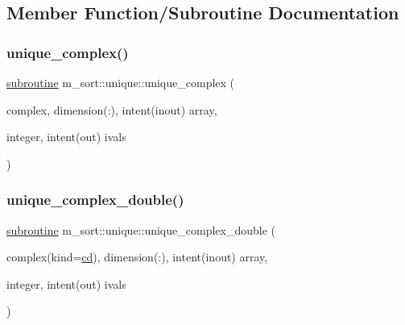 \subsection{Member Function/\+Subroutine Documentation}
\mbox{\label{interfacem__sort_1_1unique_a2c70be0dbee027039dc164c8500963a0}} 
\subsubsection{\texorpdfstring{unique\+\_\+complex()}{unique\_complex()}}
{\footnotesize\ttfamily \hyperlink{M__stopwatch_83_8txt_acfbcff50169d691ff02d4a123ed70482}{subroutine} m\+\_\+sort\+::unique\+::unique\+\_\+complex (\begin{DoxyParamCaption}\item[{complex, dimension(\+:), intent(inout)}]{array,  }\item[{integer, intent(out)}]{ivals }\end{DoxyParamCaption})\hspace{0.3cm}{\ttfamily [private]}}

\mbox{\label{interfacem__sort_1_1unique_a049259cd14295e1b5005151504cb1d82}} 
\subsubsection{\texorpdfstring{unique\+\_\+complex\+\_\+double()}{unique\_complex\_double()}}
{\footnotesize\ttfamily \hyperlink{M__stopwatch_83_8txt_acfbcff50169d691ff02d4a123ed70482}{subroutine} m\+\_\+sort\+::unique\+::unique\+\_\+complex\+\_\+double (\begin{DoxyParamCaption}\item[{complex(kind=\hyperlink{namespacem__sort_a2e8760d2fbf02c41be1e16f82c9f58e2}{cd}), dimension(\+:), intent(inout)}]{array,  }\item[{integer, intent(out)}]{ivals }\end{DoxyParamCaption})\hspace{0.3cm}{\ttfamily [private]}}

